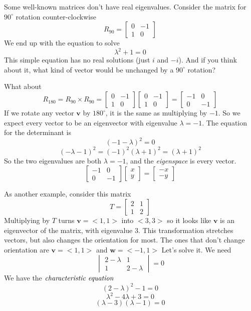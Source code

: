 \documentclass[11pt, oneside]{article}
\begin{document}
Some well-known matrices don't have real eigenvalues.  Consider the matrix for $90^\circ$ rotation counter-clockwise
\[
R_{90}  = 
\begin{bmatrix}
0 & -1  \\  
1 & 0  
\end{bmatrix}
\]
We end up with the equation to solve
\[ \lambda^2 + 1 = 0  \]
This simple equation has no real solutions (just $i$ and $-i$).  And if you think about it, what kind of vector would be unchanged by a $90^\circ$ rotation?

What about 
\[
R_{180} = R_{90} \times R_{90}  =
\begin{bmatrix}
0 & -1  \\  
1 & 0  
\end{bmatrix}
\begin{bmatrix}
0 & -1  \\  
1 & 0  
\end{bmatrix}
=
\begin{bmatrix}
-1 & 0  \\  
0 & -1  
\end{bmatrix}
\]
If we rotate any vector $\mathbf{v}$ by $180^\circ$, it is the same as multiplying by $-1$.  So we expect every vector to be an eigenvector with eigenvalue $\lambda = -1$.  The equation for the determinant is
\[ (-1 - \lambda)^2 = 0 \]
\[ (-\lambda - 1)^2 = (-1)^2(\lambda + 1)^2 = (\lambda + 1)^2 \]
So the two eigenvalues are both $\lambda = -1$, and the \emph{eigenspace} is every vector.
\[
\begin{bmatrix}
-1 & 0  \\  
0 & -1  
\end{bmatrix}
\begin{bmatrix}
x  \\  
y  
\end{bmatrix}
=
\begin{bmatrix}
-x  \\  
-y  
\end{bmatrix}
\]


As another example, consider this matrix
\[
T = 
\begin{bmatrix}
2 & 1  \\  
1 & 2  
\end{bmatrix}
\]
Multiplying by $T$ turns $\mathbf{v} = <1,1>$ into $<3,3>$ so it looks like $\mathbf{v}$ is an eigenvector of the matrix, with eigenvalue $3$.  This transformation stretches vectors, but also changes the orientation for most.  The ones that don't change orientation are $\mathbf{v} = <1,1>$ and $\mathbf{w} = <-1,1>$  Let's solve it.  We need
\[
\begin{vmatrix}
2-\lambda & 1  \\  
1 & 2-\lambda  
\end{vmatrix}
= 0
\]
We have the $\emph{characteristic equation}$
\[ (2-\lambda)^2 - 1 = 0 \]
\[ \lambda^2 - 4\lambda +3 = 0 \]
\[ (\lambda - 3) ( \lambda - 1) = 0 \]
\end{document}
